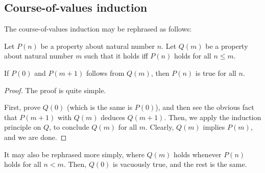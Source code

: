 \subsection{Course-of-values induction}
The course-of-values induction may be rephrased as follows:
\begin{thm}
Let $P(n)$ be a property about natural number $n$. Let $Q(m)$ be a property
about natural number $m$ such that it holds iff $P(n)$ holds for all $n \le m$.

If $P(0)$ and $P(m+1)$ follows from $Q(m)$, then $P(n)$ is true for all $n$. 
\end{thm}
\begin{proof}
The proof is quite simple.

First, prove $Q(0)$ (which is the same is $P(0)$), and then see the
obvious fact that $P(m+1)$ with $Q(m)$ deduces $Q(m+1)$. Then, we apply the
induction principle on $Q$, to conclude $Q(m)$ for all $m$. Clearly, $Q(m)$
implies $P(m)$, and we are done.
\end{proof}

It may also be rephrased more simply, where $Q(m)$ holds whenever $P(n)$ holds
for all $n < m$. Then, $Q(0)$ is vacuously true, and the rest is the same.
